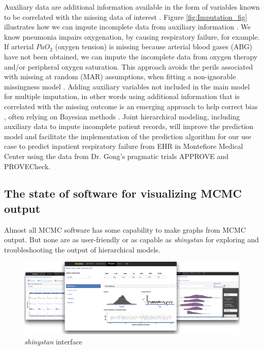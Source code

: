 \documentclass[11pt,notitlepage]{article}
\begin{document}
Auxiliary data are additional information available in the form of variables known 
to be correlated with the missing data of interest 
\cite{Hall_25389642,Daniels24571539}. Figure \ref{fig:Imputation_fig} 
illustrates how we can impute incomplete data from auxiliary information 
\cite{Ibrahim2001auxilliaryImputaton,Schomaker23873614}. We know pneumonia 
impairs oxygenation, by causing respiratory failure, for example. If 
arterial $PaO_2$ (oxygen tension) is missing because arterial blood 
gases (ABG) have not been obtained, we can impute the incomplete data 
from oxygen therapy and/or peripheral oxygen saturation\cite{Hall_25389642}. 
This approach avoids the perils associated with missing at random (MAR) 
assumptions, when fitting a non-ignorable missingness model \cite{Wang_20029935}. 
Adding auxiliary variables not included in the main model for multiple imputation, 
in other words using additional information that is correlated with the missing 
outcome is an emerging approach to help correct bias 
\cite{Meng1994, Collins_11778676, Rubin1996}, often relying on 
Bayesian methods \cite{Daniels2008, Schafer1997}. Joint hierarchical 
modeling, including auxiliary data to impute incomplete patient records, 
will improve the prediction model and facilitate the implementation of the 
prediction algorithm \cite{Hall_25389642} for our use case to predict inpatient respiratory failure from EHR 
in Montefiore Medical Center using the data from Dr. Gong's pragmatic trials APPROVE and PROVECheck.

\subsection*{The state of software for visualizing MCMC output}

Almost all MCMC software has some capability to make graphs from MCMC output. But none are as
user-friendly or as capable as \textit{shinystan} for exploring and troubleshooting the output of 
hierarchical models.

\begin{figure}
  \vspace{-10pt}
 \includegraphics[scale=1.2]{Figures/shinystan.png}
  \vspace{-12pt}
  \caption{\textit{shinystan} interface}
    \label{fig:shinystan}
 \vspace{- 14pt}
\end{figure}
\end{document}
